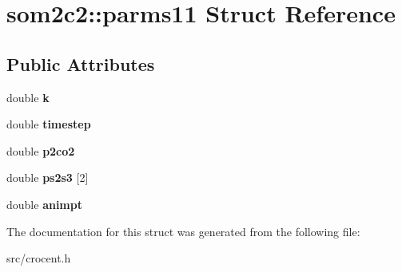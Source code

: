 \hypertarget{structsom2c2_1_1parms11}{\section{som2c2\-:\-:parms11 Struct Reference}
\label{structsom2c2_1_1parms11}
}
\subsection*{Public Attributes}
\begin{DoxyCompactItemize}
\item 
\hypertarget{structsom2c2_1_1parms11_a5a3f64438aa9f419a54d074ae322d8e1}{double {\bfseries k}}\label{structsom2c2_1_1parms11_a5a3f64438aa9f419a54d074ae322d8e1}

\item 
\hypertarget{structsom2c2_1_1parms11_a69aa08fc801c7bc4c7f1bd9facb0e88a}{double {\bfseries timestep}}\label{structsom2c2_1_1parms11_a69aa08fc801c7bc4c7f1bd9facb0e88a}

\item 
\hypertarget{structsom2c2_1_1parms11_afbb3efa32f3b4c488bd0785693b109e5}{double {\bfseries p2co2}}\label{structsom2c2_1_1parms11_afbb3efa32f3b4c488bd0785693b109e5}

\item 
\hypertarget{structsom2c2_1_1parms11_ae2b1a86554b720e7c172967979f40ca9}{double {\bfseries ps2s3} \mbox{[}2\mbox{]}}\label{structsom2c2_1_1parms11_ae2b1a86554b720e7c172967979f40ca9}

\item 
\hypertarget{structsom2c2_1_1parms11_a38911c35075b0b03bcfdb953af71c3cf}{double {\bfseries animpt}}\label{structsom2c2_1_1parms11_a38911c35075b0b03bcfdb953af71c3cf}

\end{DoxyCompactItemize}


The documentation for this struct was generated from the following file\-:\begin{DoxyCompactItemize}
\item 
src/crocent.\-h\end{DoxyCompactItemize}
